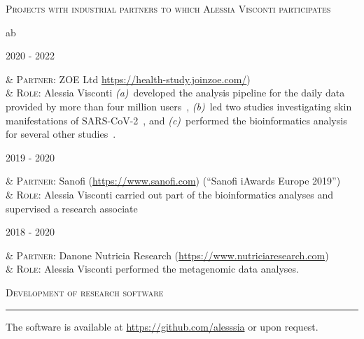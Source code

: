 \documentclass[a4paper,10pt]{article}
\newcommand{\mediumtitle}[1]{
	\vspace{0.2cm}
	{\noindent
	\Large \textsc{#1}\\[-2ex]
	\hrule
	\vspace{0.2cm}}
}
\newcommand{\smalltitle}[1]{
	\vspace{0.1cm}
	{\noindent 
	\large \textsc{#1}}
	\vspace{0.1cm}
}
\newenvironment{doubletablelist}
{
	\vspace{-0.2cm}
	\begin{longtable}[!h]{AB}}{\end{longtable}
}
\newcommand{\dtlist}[2]{
\hspace{-3cm}
\noindent
	\begin{minipage}{0.22\textwidth}
	\begin{flushright}
	\textsc{#1}
	\end{flushright}
	\end{minipage}
	& #2\\[0.2cm]
}
\newenvironment{singletablelist}
{	\vspace{-0.2cm}
	\begin{longtable}[!h]{ab}}{\end{longtable}
}
\newcommand{\stlist}[2]{
	\hspace{-3cm}
	\noindent
	\begin{minipage}{0.24\textwidth}
	\begin{flushright}
	\textsc{#1}
	\end{flushright}
	\end{minipage}
	& #2\\[0.2cm]
}
\begin{document}
\smalltitle{Projects with industrial partners to which Alessia Visconti participates}

\begin{singletablelist}

	\stlist{2020 - 2022}{
		\textsc{Partner:} ZOE Ltd \url{https://health-study.joinzoe.com/})\\
		& \textsc{Role:}  Alessia Visconti \emph{(a)}~developed the analysis pipeline for the daily data provided by more than four million users~\cite{Mur21}, \emph{(b)}~led two studies investigating skin manifestations of SARS-CoV-2~\cite{Vis21, Vis22}, and \emph{(c)}~performed the bioinformatics analysis for several other studies~\cite{Men20,Lee20,Zaz20,Hop21,Wil21,Sud21}.
	}	

	\stlist{2019 - 2020}{
		\textsc{Partner:} Sanofi (\url{https://www.sanofi.com}) (``Sanofi iAwards Europe 2019'') \\
		& \textsc{Role:} Alessia Visconti carried out part of the bioinformatics analyses and supervised a research associate
	}
	
	\stlist{2018 - 2020}{
	\textsc{Partner:} Danone Nutricia Research (\url{https://www.nutriciaresearch.com}) \\
	& \textsc{Role:} Alessia Visconti performed the metagenomic data analyses.
	}

\end{singletablelist}


%
%
%


\mediumtitle{Development of research software}

\noindent The software is available at \url{https://github.com/alesssia} or upon request.

\vspace{0.2cm}
\end{document}
